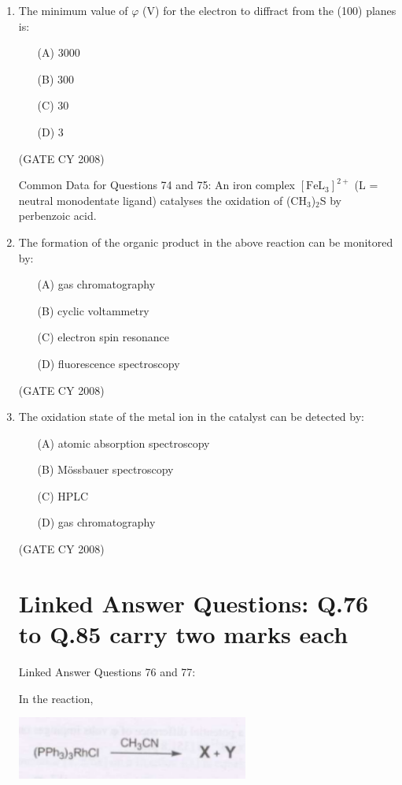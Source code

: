 \documentclass[12pt]{article}
\begin{document}
\begin{enumerate}
    \item The minimum value of $\varphi$ (V) for the electron to diffract from the (100) planes is:
    \begin{enumerate}
        \item[(A)] 3000
        \item[(B)] 300
        \item[(C)] 30
        \item[(D)] 3
    \end{enumerate}
    \hfill{(GATE CY 2008)}


{Common Data for Questions 74 and 75:} 
An iron complex $[\text{FeL}_3]^{2+}$ (L = neutral monodentate ligand) catalyses the oxidation of (CH$_3$)$_2$S by perbenzoic acid.


    \item The formation of the organic product in the above reaction can be monitored by:
    \begin{enumerate}
        \item[(A)] gas chromatography
        \item[(B)] cyclic voltammetry
        \item[(C)] electron spin resonance
        \item[(D)] fluorescence spectroscopy
    \end{enumerate}    \hfill{(GATE CY 2008)}


    \item The oxidation state of the metal ion in the catalyst can be detected by:
    \begin{enumerate}
        \item[(A)] atomic absorption spectroscopy
        \item[(B)] M\"ossbauer spectroscopy
        \item[(C)] HPLC
        \item[(D)] gas chromatography
    \end{enumerate}
  \hfill{(GATE CY 2008)}


\section{Linked Answer Questions: Q.76 to Q.85 carry two marks each}

{Linked Answer Questions 76 and 77:}

In the reaction,

\begin{center}
\includegraphics[width=0.6\textwidth]{figs/q76 1.png}
\end{center}


\end{enumerate}
\end{document}
